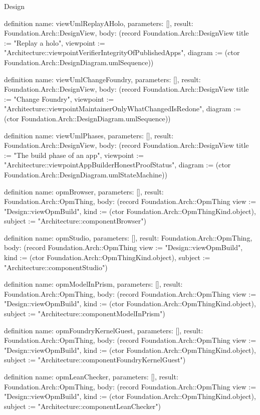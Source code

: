 \begin{lexlean}{Design}
\begin{semanticmodule}
definition{
  name: viewUmlReplayAHolo,
  parameters: [],
  result: Foundation.Arch::DesignView,
  body: (record Foundation.Arch::DesignView {title := "Replay a holo", viewpoint := "Architecture::viewpointVerifierIntegrityOfPublishedApps", diagram := (ctor Foundation.Arch::DesignDiagram.umlSequence)})
}

definition{
  name: viewUmlChangeFoundry,
  parameters: [],
  result: Foundation.Arch::DesignView,
  body: (record Foundation.Arch::DesignView {title := "Change Foundry", viewpoint := "Architecture::viewpointMaintainerOnlyWhatChangedIsRedone", diagram := (ctor Foundation.Arch::DesignDiagram.umlSequence)})
}

definition{
  name: viewUmlPhases,
  parameters: [],
  result: Foundation.Arch::DesignView,
  body: (record Foundation.Arch::DesignView {title := "The build phase of an app", viewpoint := "Architecture::viewpointAppBuilderHonestProofStatus", diagram := (ctor Foundation.Arch::DesignDiagram.umlStateMachine)})
}

definition{
  name: opmBrowser,
  parameters: [],
  result: Foundation.Arch::OpmThing,
  body: (record Foundation.Arch::OpmThing {view := "Design::viewOpmBuild", kind := (ctor Foundation.Arch::OpmThingKind.object), subject := "Architecture::componentBrowser"})
}

definition{
  name: opmStudio,
  parameters: [],
  result: Foundation.Arch::OpmThing,
  body: (record Foundation.Arch::OpmThing {view := "Design::viewOpmBuild", kind := (ctor Foundation.Arch::OpmThingKind.object), subject := "Architecture::componentStudio"})
}

definition{
  name: opmModelInPrism,
  parameters: [],
  result: Foundation.Arch::OpmThing,
  body: (record Foundation.Arch::OpmThing {view := "Design::viewOpmBuild", kind := (ctor Foundation.Arch::OpmThingKind.object), subject := "Architecture::componentModelInPrism"})
}

definition{
  name: opmFoundryKernelGuest,
  parameters: [],
  result: Foundation.Arch::OpmThing,
  body: (record Foundation.Arch::OpmThing {view := "Design::viewOpmBuild", kind := (ctor Foundation.Arch::OpmThingKind.object), subject := "Architecture::componentFoundryKernelGuest"})
}

definition{
  name: opmLeanChecker,
  parameters: [],
  result: Foundation.Arch::OpmThing,
  body: (record Foundation.Arch::OpmThing {view := "Design::viewOpmBuild", kind := (ctor Foundation.Arch::OpmThingKind.object), subject := "Architecture::componentLeanChecker"})
}


\end{semanticmodule}
\end{lexlean}
